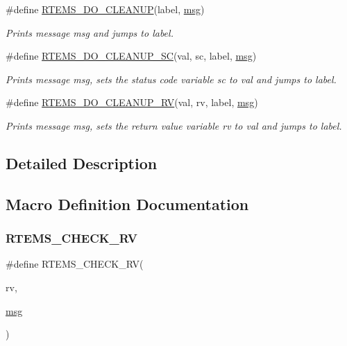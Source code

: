 \begin{DoxyCompactItemize}
\#define \mbox{\hyperlink{group__rtems__status__checks_gac0cc57548f6a154c520e57a9b69637a3}{R\+T\+E\+M\+S\+\_\+\+D\+O\+\_\+\+C\+L\+E\+A\+N\+UP}}(label,  \mbox{\hyperlink{structmsg}{msg}})
\begin{DoxyCompactList}\small\item\em Prints message {\itshape msg} and jumps to {\itshape label}. \end{DoxyCompactList}\item 
\#define \mbox{\hyperlink{group__rtems__status__checks_ga5f74dc2ba6b31bc376dcfd33386ebf47}{R\+T\+E\+M\+S\+\_\+\+D\+O\+\_\+\+C\+L\+E\+A\+N\+U\+P\+\_\+\+SC}}(val,  sc,  label,  \mbox{\hyperlink{structmsg}{msg}})
\begin{DoxyCompactList}\small\item\em Prints message {\itshape msg}, sets the status code variable {\itshape sc} to {\itshape val} and jumps to {\itshape label}. \end{DoxyCompactList}\item 
\#define \mbox{\hyperlink{group__rtems__status__checks_ga73faf2a5b5c46ff8e3e061baec934002}{R\+T\+E\+M\+S\+\_\+\+D\+O\+\_\+\+C\+L\+E\+A\+N\+U\+P\+\_\+\+RV}}(val,  rv,  label,  \mbox{\hyperlink{structmsg}{msg}})
\begin{DoxyCompactList}\small\item\em Prints message {\itshape msg}, sets the return value variable {\itshape rv} to {\itshape val} and jumps to {\itshape label}. \end{DoxyCompactList}\end{DoxyCompactItemize}


\subsection{Detailed Description}


\subsection{Macro Definition Documentation}
\mbox{\label{group__rtems__status__checks_ga53297875da9f233759947a4964f1d7dc}} 
\subsubsection{\texorpdfstring{RTEMS\_CHECK\_RV}{RTEMS\_CHECK\_RV}}
{\footnotesize\ttfamily \#define R\+T\+E\+M\+S\+\_\+\+C\+H\+E\+C\+K\+\_\+\+RV(\begin{DoxyParamCaption}\item[{}]{rv,  }\item[{}]{\mbox{\hyperlink{structmsg}{msg}} }\end{DoxyParamCaption})}

